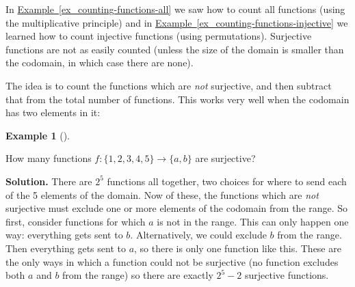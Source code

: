 \documentclass[10pt,]{book}
\theoremstyle{plain}
\theoremstyle{definition}
\newtheorem{example}[theorem]{Example}
\theoremstyle{definition}
\theoremstyle{definition}
\numberwithin{equation}{section}
\begin{document}
\par

      In \hyperref[ex_counting-functions-all]{Example~\ref{ex_counting-functions-all}} we saw how to count all functions (using the multiplicative principle) and in \hyperref[ex_counting-functions-injective]{Example~\ref{ex_counting-functions-injective}} we learned how to count injective functions (using permutations).  Surjective functions are not as easily counted (unless the size of the domain is smaller than the codomain, in which case there are none).
\par

    The idea is to count the functions which are \emph{not} surjective, and then subtract that from the total number of functions. This works very well when the codomain has two elements in it:
\begin{example}[]\label{example-52}

    How many functions \(f: \{1,2,3,4,5\} \to \{a,b\}\) are surjective?
\par\medskip\noindent%
\textbf{Solution.}\quad 
    There are \(2^5\) functions all together, two choices for where to send each of the 5 elements of the domain. Now of these, the functions which are \emph{not} surjective must exclude one or more elements of the codomain from the range. So first, consider functions for which \(a\) is not in the range. This can only happen one way: everything gets sent to \(b\). Alternatively, we could exclude \(b\) from the range. Then everything gets sent to \(a\), so there is only one function like this. These are the only ways in which a function could not be surjective (no function excludes both \(a\) and \(b\) from the range) so there are exactly \(2^5 - 2\) surjective functions.
\end{example}
\par
\end{document}
